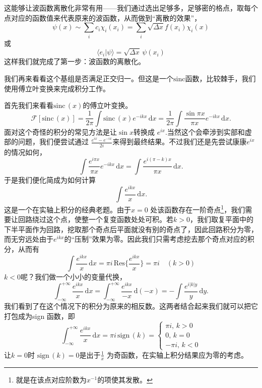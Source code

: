 \documentclass[12pt,a4paper,openany,twoside]{book}
\numberwithin{equation}{section}
\newcommand{\sinc}[1]{\mathrm{sinc} \, (#1)}
\begin{document}
        这能够让波函数离散化非常有用——我们通过选出足够多，足够密的格点，取每个点对应的函数值来代表原来的波函数，从而做到``离散的效果''，
        \begin{equation}
      	  \psi(x) \sim \sum_i c_i \chi_i (x_i) = \sum_i \sqrt{\Delta x} f(x_i) \chi_i (x) 
        \end{equation}
        或
        \begin{equation}
      	  \langle e_i | \psi \rangle = \sqrt{\Delta x} \,\psi(x_i) 
        \end{equation}
        这样我们就完成了第一步：波函数的离散化。

        我们再来看看这个基组是否满足正交归一。但这是一个$\mathrm{sinc}$函数，比较棘手，我们使用傅立叶变换来完成积分工作。

        首先我们来看看$\sinc{x}$的傅立叶变换。
        \[
        	\mathcal{F}[\sinc{x}] =  \frac{1}{2\pi}\int \sinc{x} e^{-ikx} \, \mathrm{d}x  = \frac{1}{2\pi}  \int \frac{\sin{\pi x}}{\pi x} e^{-ikx} \, \mathrm{d}x 
        .\]
        面对这个奇怪的积分的常见方法是让$\sin{x}$转换成 $e^{ix}$.当然这个会牵涉到实部和虚部的问题，我们便尝试通过 $\frac{e^{ix}-e^{-ix}}{2i}$来得到最终结果。不过我们还是先尝试康康$e^{ix}$的情况如何，
        \[
      	  \int \frac{e^{i\pi x}}{\pi x}e^{-ikx} \, \mathrm{d}x = \int \frac{e^{i(\pi -k) x}}{\pi x} \, \mathrm{d} x
        .\]
        于是我们便化简成为如何计算
        \[
      	  \int \frac{e^{ikx}}{x} \, \mathrm{d}x 
        .\] 
        这是一个在实轴上积分的经典老题。由于$x=0$ 处该函数存在一阶奇点\footnote{就是在该点对应阶数为$x^{-1}$的项使其发散。}，我们需要让回路绕过这个点，使整一个复变函数处处可积。若$k>0$，我们取复平面中的下半平面作为回路，挖取那个奇点后平面就没有别的奇点了，因此回路积分为零，而无穷远处由于$e^{ikx}$的``压制''效果为零。因此我们只需考虑挖去那个奇点对应的积分，从而有
        \begin{equation}
      	  \int \frac{e^{ikx}}{x} \, \mathrm{d}x =  \pi i \, \mathrm{Res}\{\frac{e^{ikx}}{x}\} = \pi i \quad (k>0)
        \end{equation}
        $k<0$呢？我们做一个小小的变量代换，
        \[
          \int_{-\infty}^{+\infty} \frac{e^{ikx}}{x} \, \mathrm{d}x = \int_{-\infty}^{+\infty} \frac{e^{ikx}}{-x} \, \mathrm{d}(-x) =- \int \frac{e^{i|k|y}}{y} \, \mathrm{d} y   
        .\] 
        我们看到了在这个情况下的积分为原来的相反数。这两者结合起来我们就可以把它打包成为sign 函数，即
        \begin{equation}
      	  \int _{-\infty} ^{+\infty} \frac{e^{ikx}}{x} \, \mathrm{d}x = \pi i \, \mathrm{sign}\,(k) = 
      	  \begin{cases}
      	    \pi i, \, k>0 \\
      		  0, \, k=0 \\
      		  -\pi i, \, k<0
      	  \end{cases}
        \end{equation}
        让$k=0$时 $\mathrm{sign}\,(k)=0$是出于$\frac{1}{x}$ 为奇函数，在实轴上积分结果应为零的考虑。
\end{document}
